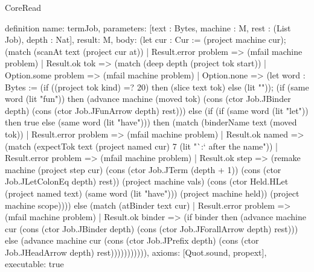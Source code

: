 \begin{lexlean}{CoreRead}
\begin{semanticmodule}
definition{
  name: termJob,
  parameters: [text : Bytes, machine : M, rest : (List Job), depth : Nat],
  result: M,
  body: (let cur : Cur := (project machine cur); (match (scanAt text (project cur at))
    | Result.error problem => (mfail machine problem)
    | Result.ok tok => (match (deep depth (project tok start))
      | Option.some problem => (mfail machine problem)
      | Option.none => (let word : Bytes := (if ((project tok kind) =? 20) then (slice text tok) else (lit "")); (if (same word (lit "fun")) then (advance machine (moved tok) (cons (ctor Job.JBinder depth) (cons (ctor Job.JFunArrow depth) rest))) else (if (if (same word (lit "let")) then true else (same word (lit "have"))) then (match (binderName text (moved tok))
        | Result.error problem => (mfail machine problem)
        | Result.ok named => (match (expectTok text (project named cur) 7 (lit "`:` after the name"))
          | Result.error problem => (mfail machine problem)
          | Result.ok step => (remake machine (project step cur) (cons (ctor Job.JTerm (depth + 1)) (cons (ctor Job.JLetColonEq depth) rest)) (project machine vals) (cons (ctor Held.HLet (project named text) (same word (lit "have"))) (project machine held)) (project machine scope)))) else (match (atBinder text cur)
        | Result.error problem => (mfail machine problem)
        | Result.ok binder => (if binder then (advance machine cur (cons (ctor Job.JBinder depth) (cons (ctor Job.JForallArrow depth) rest))) else (advance machine cur (cons (ctor Job.JPrefix depth) (cons (ctor Job.JHeadArrow depth) rest))))))))))),
  axioms: [Quot.sound, propext],
  executable: true
}


\end{semanticmodule}
\end{lexlean}
